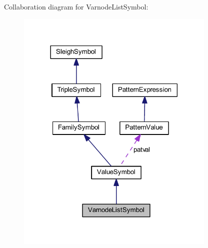 Collaboration diagram for Varnode\+List\+Symbol\+:
\nopagebreak
\begin{figure}[H]
\begin{center}
\leavevmode
\includegraphics[width=270pt]{class_varnode_list_symbol__coll__graph}
\end{center}
\end{figure}

